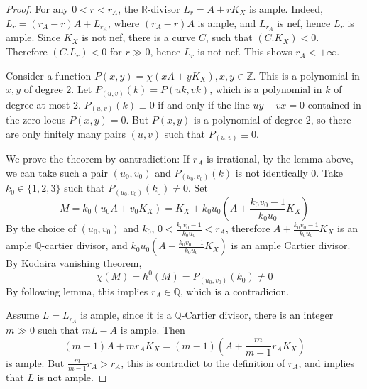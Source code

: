 \documentclass{article}
\begin{document}
\begin{proof}
	For any $ 0<r<r_A $, the $ \mathbb{R} $-divisor $ L_r=A+rK_X $ is ample. Indeed, $ L_r=(r_A-r)A+L_{r_A} $, where $ (r_A-r)A $ is ample, and $ L_{r_A} $ is nef, hence $ L_r $ is ample. Since $ K_X $ is not nef, there is a curve $ C $, such that $ (C.K_X)<0 $. Therefore  $ (C.L_r)<0 $ for $ r\gg 0 $, hence $ L_r $ is not nef. This shows $ r_A<+\infty $.
	
	Consider a function $ P(x,y)=\chi (xA+yK_X), x,y\in \mathbb{Z} $. This is a polynomial in $ x,y $ of degree $ 2 $. Let $ P_{(u,v)}(k)=P(uk,vk) $, which is a polynomial in $ k $ of degree at most $ 2 $. $ P_{(u,v)}(k)\equiv0 $ if and only if the line $ uy-vx=0 $ contained in the zero locus $ P(x,y)=0 $. But $ P(x,y) $ is a polynomial of degree $ 2 $, so there are only finitely many pairs $ (u,v) $ such that $ P_{(u,v)}\equiv 0 $. 
	
	We prove the theorem by oantradiction: If $ r_A $ is irrational, by the lemma above, we can take such a pair $ (u_0,v_0) $ and $ P_{(u_0,v_0)}(k) $ is not identically $ 0 $. Take $ k_0\in \{1,2,3\} $ such that $ P_{(u_0,v_0)}(k_0)\neq 0  $. Set
	$$ M=k_0(u_0A+v_0K_X)=K_X+k_0u_0(A+\frac{k_0v_0-1}{k_0u_0}K_X) $$
	By the choice of $ (u_0,v_0) $ and $ k_0 $, $ 0<\frac{k_0v_0-1}{k_0u_0}<r_A $, therefore $ A+\frac{k_0v_0-1}{k_0u_0}K_X $ is an ample $ \mathbb{Q} $-cartier divisor, and $ k_0u_0(A+\frac{k_0v_0-1}{k_0u_0}K_X)  $ is an ample Cartier divisor. By Kodaira vanishing theorem, 
	$$\chi(M)=h^0(M)=P_{(u_0,v_0)}(k_0)\neq 0 $$
	By following lemma, this implies $ r_A\in \mathbb{Q} $, which is a contradicion.
	
	Assume $ L=L_{r_A} $ is ample, since it is a $ \mathbb{Q} $-Cartier divisor, there is  an integer $ m\gg0 $ such that $ mL-A $ is ample. Then 
	$$ (m-1)A+mr_AK_X=(m-1)(A+\frac{m}{m-1}r_AK_X) $$
	is ample. But $ \frac{m}{m-1}r_A>r_A $, this is contradict to the definition of $ r_A $, and implies that $ L $ is not ample.
\end{proof}
\end{document}
